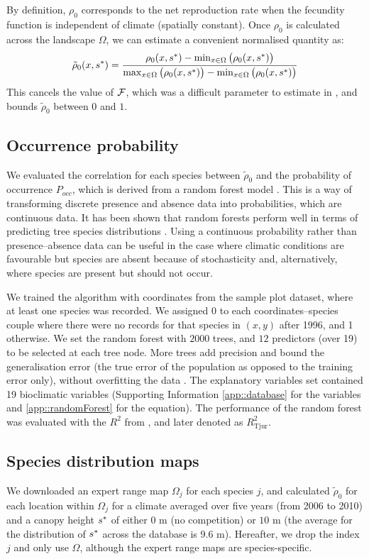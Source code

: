 By definition, $ \rho_0 $ corresponds to the net reproduction rate when the fecundity function is independent of climate (\ie spatially constant). Once $ \rho_0 $ is calculated across the landscape $ \Omega $, we can estimate a convenient normalised quantity as:
\begin{equation} \label{eq::rho0_scaled}
	\tilde \rho_0(x, {s}^{*}) = \frac{\rho_0(x, {s}^{*}) - \min_{x \in \Omega} \big(\rho_0(x, {s}^{*}) \big)}{\max_{x \in \Omega} \big(\rho_0(x, {s}^{*}) \big) - \min_{x \in \Omega} \big(\rho_0(x, {s}^{*}) \big)}
\end{equation}
This cancels the value of $ \mathcal{F} $, which was a difficult parameter to estimate in \citet{Purves2008}, and bounds $ \tilde \rho_0 $ between $ 0 $ and $ 1 $.

\subsection{Occurrence probability}
We evaluated the correlation for each species between $ \tilde \rho_0 $ and the probability of occurrence $ P_{occ} $, which is derived from a random forest model \citep[R package]{randomForest}. This is a way of transforming discrete presence and absence data into probabilities, which are continuous data. It has been shown that random forests perform well in terms of predicting tree species distributions \citep{Prasad2006}. Using a continuous probability rather than presence--absence data can be useful in the case where climatic conditions are favourable but species are absent because of stochasticity and, alternatively, where species are present but should not occur.

We trained the algorithm with coordinates from the sample plot dataset, where at least one species was recorded. We assigned 0 to each coordinates--species couple where there were no records for that species in $ (x, y) $ after 1996, and 1 otherwise. We set the random forest with $ 2000 $ trees, and $ 12 $ predictors (over 19) to be selected at each tree node. More trees add precision and bound the generalisation error (\ie the true error of the population as opposed to the training error only), without overfitting the data \citep{Prasad2006}. The explanatory variables set contained 19 bioclimatic variables (Supporting Information \ref{app::database} for the variables and \ref{app::randomForest} for the equation). The performance of the random forest was evaluated with the $ R^2 $ from \citet{Tjur2009}, and later denoted as $ R_{\text{Tjur}}^2 $.

\subsection{Species distribution maps}
We downloaded an expert range map $ \Omega_j $ \citep{Prasad2003, Little1971} for each species $ j $, and calculated $ \tilde \rho_0 $ for each location within $ \Omega_j $ for a climate averaged over five years (from 2006 to 2010) and a canopy height $ {s}^{*} $ of either $ 0 $ m (no competition) or $ 10 $ m (the average for the distribution of $ {s}^{*} $ across the database is $ 9.6 $ m). Hereafter, we drop the index $ j $ and only use $ \Omega $, although the expert range maps are species-specific.

